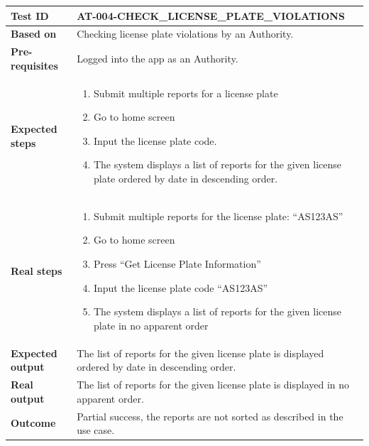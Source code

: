 \begin{table}[H]
    \centering
    \begin{tabular}{p{3cm}p{10cm}}
    \textbf{Test ID} & AT-004-CHECK\_LICENSE\_PLATE\_VIOLATIONS \\ \hline
    \textbf{Based on} & Checking license plate violations by an Authority. \\ \hline
    \textbf{Pre-requisites} & Logged into the app as an Authority. \\ \hline
    \textbf{Expected steps} & 
        \begin{enumerate} \itemsep0em
            \item Submit multiple reports for a license plate
            \item Go to home screen
            \item Input the license plate code.
            \item The system displays a list of reports for the given license plate ordered by date in descending order.
        \end{enumerate} \\ \hline
    \textbf{Real steps} & 
        \begin{enumerate} \itemsep0em
            \item Submit multiple reports for the license plate: “AS123AS”
            \item Go to home screen
            \item Press “Get License Plate Information”
            \item Input the license plate code “AS123AS”
            \item The system displays a list of reports for the given license plate in no apparent order
        \end{enumerate} \\ \hline
    \textbf{Expected output} & The list of reports for the given license plate is displayed ordered by date in descending order. \\ \hline
    \textbf{Real output} &  The list of reports for the given license plate is displayed in no apparent order. \\ \hline
    \textbf{Outcome} & Partial success, the reports are not sorted as described in the use case. \\ \hline
    \end{tabular}
\end{table}

